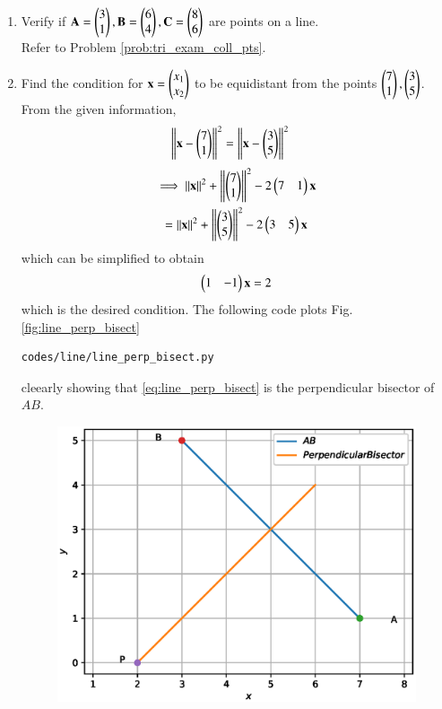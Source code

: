 \renewcommand{\theequation}{\theenumi}
\begin{enumerate}[label=\arabic*.,ref=\thesubsection.\theenumi]


\item Verify if $\mathbf{A} = \begin{pmatrix}3\\1\end{pmatrix}, \mathbf{B} = \begin{pmatrix}6\\4\end{pmatrix}, \mathbf{C} = \begin{pmatrix}8\\6\end{pmatrix}$ are points on a line.
\\
\solution Refer to Problem \ref{prob:tri_exam_coll_pts}.

\item Find the condition for $\mathbf{x} = \begin{pmatrix}x_1\\x_2\end{pmatrix}$ to be equidistant from the points $\begin{pmatrix}7\\1\end{pmatrix}, \begin{pmatrix}3\\5\end{pmatrix}$.
\label{prob:line_perp_bisect}
%
\\
\solution From the given information,
%
\begin{align}
\left\lVert\mathbf{x}-\begin{pmatrix}7\\1\end{pmatrix}\right\rVert^2&=\left\lVert\mathbf{x}-\begin{pmatrix}3\\5\end{pmatrix}\right\rVert^2
\end{align}
\begin{multline}
\implies \left\lVert\mathbf{x}\right\rVert^2 + \left\lVert\begin{pmatrix}7\\1\end{pmatrix}\right\rVert^2-2\begin{pmatrix}7&1\end{pmatrix}\mathbf{x} 
\\= 
 \left\lVert\mathbf{x}\right\rVert^2 + \left\lVert\begin{pmatrix}3\\5\end{pmatrix}\right\rVert^2-2\begin{pmatrix}3&5\end{pmatrix}\mathbf{x} 
\end{multline}
%
which can be simplified to obtain
\begin{align}
\label{eq:line_perp_bisect}
\begin{pmatrix}1 & -1\end{pmatrix}\mathbf{x} = 2
\end{align}
%
which is the desired condition.  
The following code plots Fig. \ref{fig:line_perp_bisect}
%
\begin{lstlisting}
codes/line/line_perp_bisect.py
\end{lstlisting}
%
cleearly showing that \eqref{eq:line_perp_bisect} is the perpendicular bisector of $AB$.
\begin{figure}[!ht]
\includegraphics[width=\columnwidth]{./line/figs/line_perp_bisect.eps}

\end{figure}
\end{enumerate}
